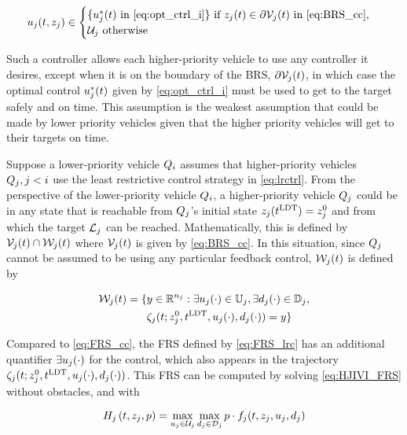 \begin{equation}
\label{eq:lrctrl} %
\ctrl_j(t, \state_j)\in \begin{cases} \{\ctrl_j^*(t) \text{ in \eqref{eq:opt_ctrl_i}}\} \text{ if } \state_j(t)\in \partial \brs_j(t) \text{ in \eqref{eq:BRS_cc}}, \\
\cset_j  \text{ otherwise}
\end{cases}
\end{equation}

Such a controller allows each higher-priority vehicle to use any controller it desires, except when it is on the boundary of the BRS, $\partial \mathcal{V}_j(t)$, in which case the optimal control $u_j^*(t)$ given by \eqref{eq:opt_ctrl_i} must be used to get to the target safely and on time. This assumption is the weakest assumption that could be made by lower priority vehicles given that the higher priority vehicles will get to their targets on time.

Suppose a lower-priority vehicle $Q_{i}$ assumes that higher-priority vehicles $Q_{j}, j < i$ use the least restrictive control strategy in \eqref{eq:lrctrl}. From the perspective of the lower-priority vehicle $Q_{i}$, a higher-priority vehicle $Q_{j}$ could be in any state that is reachable from $Q_{j}$'s initial state $z_j(t^\text{LDT}) =z_j^0$ and from which the target $\mathcal{L}_j$ can be reached. Mathematically, this is defined by $\mathcal{V}_j(t) \cap \mathcal{W}_j(t)$ where $\mathcal{V}_j(t)$ is given by \eqref{eq:BRS_cc}. In this situation, since $Q_{j}$ cannot be assumed to be using any particular feedback control, $\mathcal{W}_j(t)$ is defined by

\begin{equation}
\label{eq:FRS_lrc}
\begin{aligned}
\frs_j(t) = \{&y \in \R^{n_j}:\exists \ctrl_j(\cdot) \in \cfset_j, \exists \dstb_j(\cdot) \in \dfset_j, \\
&\traj_j(t; \state^0_j, \ldt, \ctrl_j(\cdot), \dstb_j(\cdot))= y\}
\end{aligned}
\end{equation}

Compared to \eqref{eq:FRS_cc}, the FRS defined by \eqref{eq:FRS_lrc} has an additional quantifier $\exists u_j(\cdot)$ for the control, which also appears in the trajectory $\zeta_j(t; z^0_j, t^\text{LDT}, u_j(\cdot), d_j(\cdot))$. This FRS can be computed by solving \eqref{eq:HJIVI_FRS} without obstacles, and with

\begin{equation}
H_j\left(t, z_j, p\right) = \max_{u_j \in \mathcal{U}_j} \max_{d_j \in \mathcal{D}_j} p \cdot f_j(t, z_j, u_j, d_j)
\end{equation}

